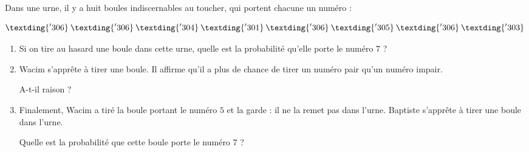
\medskip 

Dans une urne, il y a huit boules indiscernables au toucher, qui portent chacune un numéro : 

\begin{large}
\[\textding{'306}\:\textding{'306}\: \textding{'304}\:\textding{'301}\:\textding{'306}\:\textding{'305}\:\textding{'306}\: \textding{'303}\:\]
\end{large}
\begin{enumerate}
\item  Si on tire au hasard une boule dans cette urne, quelle est la probabilité qu'elle porte le numéro $7$ ? 
\item  Wacim s'apprête à tirer une boule. Il affirme qu'il a plus de chance de tirer un numéro pair qu'un numéro impair. 

A-t-il raison ? 
\item  Finalement, Wacim a tiré la boule portant le numéro $5$ et la garde : il ne la remet pas dans l'urne. Baptiste s'apprête à tirer une boule dans l'urne. 

Quelle est la probabilité que cette boule porte le numéro 7 ? 
\end{enumerate}

\vspace{0,5cm}

